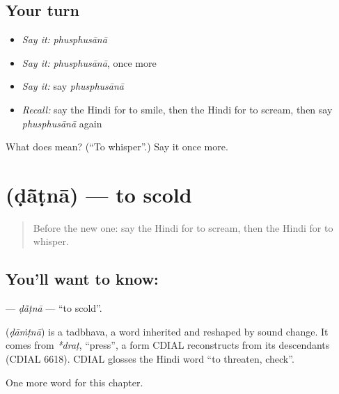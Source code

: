 \subsection*{Your turn}
\begin{itemize}
\raggedright
  \item \emph{Say it:} \emph{phusphusānā}
  \item \emph{Say it:} \emph{phusphusānā}, once more
  \item \emph{Say it:} say \emph{phusphusānā}
  \item \emph{Recall:} say the Hindi for to smile, then the Hindi for to scream, then say \emph{phusphusānā} again
\end{itemize}

\begin{tcolorbox}[breakable,colback=teal!4,colframe=teal!35!black,title={Before you move on}]
What does  mean? (\textquotedblleft{}To whisper\textquotedblright{}.) Say it once more.
\end{tcolorbox}
\section[\texorpdfstring{\hi{डाँटना} (ḍā̃ṭnā)}{डाँटना (ḍā̃ṭnā)}]{ (ḍā̃ṭnā) — to scold}

\label{lesson:HI-C232-datna}



\begin{quote}
Before the new one: say the Hindi for to scream, then the Hindi for to whisper.
\end{quote}

\subsection*{You'll want to know: }
\textbf{} — \emph{ḍā̃ṭnā} — \textquotedblleft{}to scold\textquotedblright{}.

\begin{cousinweb}
\textbf{} (\emph{ḍāṁṭnā}) is a tadbhava, a word inherited and reshaped by sound change. It comes from \emph{*draṭ}, \textquotedblleft{}press\textquotedblright{}, a form CDIAL reconstructs from its descendants (CDIAL 6618). CDIAL glosses the Hindi word \textquotedblleft{}to threaten, check\textquotedblright{}.
\end{cousinweb}

\begin{grammarlens}[title={What you've built}]
One more word for this chapter.
\end{grammarlens}

